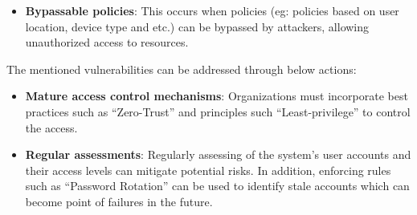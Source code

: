 \documentclass[11pt,letterpaper]{article}
\newenvironment{answer}{\em \color{blue} \begin{adjustwidth}{1cm}{1cm}}{\end{adjustwidth}}
\begin{document}
\begin{enumerate}
\begin{answer}
\begin{itemize}
				\item \textbf{Bypassable policies}: This occurs when policies (eg: policies based on user location, device type and etc.) can be bypassed by attackers, allowing unauthorized access to resources. 
			\end{itemize}
		
		The mentioned vulnerabilities can be addressed through below actions:
		
		\begin{itemize}
			\item \textbf{Mature access control mechanisms}: Organizations must incorporate best practices such as ``Zero-Trust'' and principles such ``Least-privilege'' to control the access. 
			
			\item \textbf{Regular assessments}: Regularly assessing of the system's user accounts and their access levels can mitigate potential risks. In addition, enforcing rules such as ``Password Rotation'' can be used to identify stale accounts which can become point of failures in the future.
		\end{itemize}
		\end{answer}
		
	\end{enumerate}
	
\end{document}
